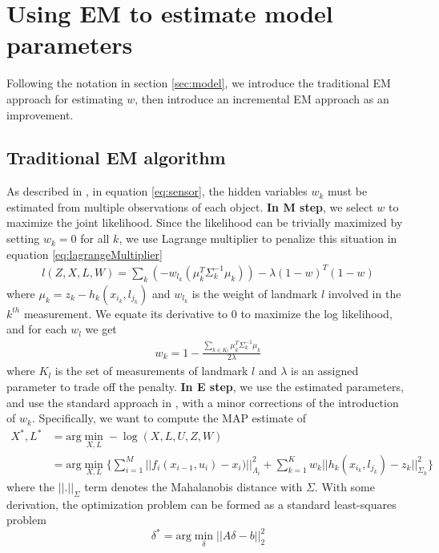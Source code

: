 \section{Using EM to estimate model parameters}
Following the notation in section \ref{sec:model}, we introduce the traditional EM approach for estimating $w$, then introduce an incremental EM approach as an  improvement.
\subsection{Traditional EM algorithm}
\label{sec:traditionalEM}
As described in \cite{rogers2010slam}, in equation \ref{eq:sensor}, the hidden variables $w_k$ must be estimated from multiple observations of each object. \textbf{In M step}, we select $w$ to maximize the joint likelihood. Since the likelihood can be trivially maximized by setting $w_k = 0$ for all $k$, we use Lagrange multiplier to penalize this situation in equation \ref{eq:lagrangeMultiplier}
\begin{equation}
\begin{aligned}
l(Z, X, L, W) = \sum\limits_k(-w_{l_k}(\mu_k^T\Sigma_k^{-1}\mu_k)) - \lambda(1 - w)^T(1 - w)
\end{aligned}
\label{eq:lagrangeMultiplier}
\end{equation}
where $\mu_k = z_k - h_k(x_{i_k}, l_{j_k})$ and $w_{l_k}$ is the weight of landmark $l$ involved in the $k^{th}$ measurement. We equate its derivative to 0 to maximize the log likelihood, and for each $w_l$ we get
\begin{equation}
\begin{aligned}
w_k = 1 - \frac{\sum_{k \in K_l}\mu_k^T\Sigma_k^{-1}\mu_k}{2\lambda}
\end{aligned}
\label{eq:wk}
\end{equation}
where $K_l$ is the set of measurements of landmark $l$ and $\lambda$ is an assigned parameter to trade off the penalty. \textbf{In E step}, we use the estimated parameters, and use the standard approach in \cite{isam}, with a minor corrections of the introduction of $w_k$. Specifically, we want to compute the MAP estimate of 
\begin{equation}
\begin{aligned}
X^*, L^* &= \text{arg}\min\limits_{X, L}-\log(X, L, U, Z, W)\\
&=\text{arg}\min\limits_{X, L}\{\sum\limits_{i=1}^M||f_i(x_{i-1}, u_i) - x_i)||^2_{\Lambda_i} + \sum\limits_{k=1}^Kw_k||h_k(x_{i_k}, l_{j_k}) - z_k||^2_{\Sigma_k}\}
\end{aligned}
\label{eq:MAP}
\end{equation}
where the $||.||_\Sigma$ term denotes the Mahalanobis distance with $\Sigma$. With some derivation, the optimization problem can be formed as a standard least-squares problem
\begin{equation}
\delta^* = \text{arg}\min\limits_\delta||A\delta - b||_2^2
\label{eq:optimization}
\end{equation}

